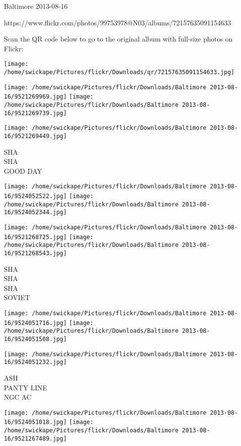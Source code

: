 \documentclass[10pt,letterpaper]{article}
\begin{document}
Baltimore 2013-08-16

https://www.flickr.com/photos/99753978@N03/albums/72157635091154633

Scan the QR code below to go to the original album with full-size photos on Flickr:

\texttt{[image: /home/swickape/Pictures/flickr/Downloads/qr/72157635091154633.jpg]}
\pagebreak

\texttt{[image: /home/swickape/Pictures/flickr/Downloads/Baltimore 2013-08-16/9521269969.jpg]}
\texttt{[image: /home/swickape/Pictures/flickr/Downloads/Baltimore 2013-08-16/9521269739.jpg]}

\vspace{0.25in}
\texttt{[image: /home/swickape/Pictures/flickr/Downloads/Baltimore 2013-08-16/9521269449.jpg]}

SHA\\
SHA\\
GOOD DAY
\pagebreak

\texttt{[image: /home/swickape/Pictures/flickr/Downloads/Baltimore 2013-08-16/9524052522.jpg]}
\texttt{[image: /home/swickape/Pictures/flickr/Downloads/Baltimore 2013-08-16/9524052344.jpg]}

\texttt{[image: /home/swickape/Pictures/flickr/Downloads/Baltimore 2013-08-16/9521268725.jpg]}
\texttt{[image: /home/swickape/Pictures/flickr/Downloads/Baltimore 2013-08-16/9521268543.jpg]}

SHA\\
SHA\\
SHA\\
SOVIET
\pagebreak

\texttt{[image: /home/swickape/Pictures/flickr/Downloads/Baltimore 2013-08-16/9524051716.jpg]}
\texttt{[image: /home/swickape/Pictures/flickr/Downloads/Baltimore 2013-08-16/9524051508.jpg]}

\vspace{0.25in}
\texttt{[image: /home/swickape/Pictures/flickr/Downloads/Baltimore 2013-08-16/9524051232.jpg]}

ASH\\
PANTY LINE\\
NGC AC
\pagebreak

\texttt{[image: /home/swickape/Pictures/flickr/Downloads/Baltimore 2013-08-16/9524051018.jpg]}
\texttt{[image: /home/swickape/Pictures/flickr/Downloads/Baltimore 2013-08-16/9521267489.jpg]}
\end{document}
